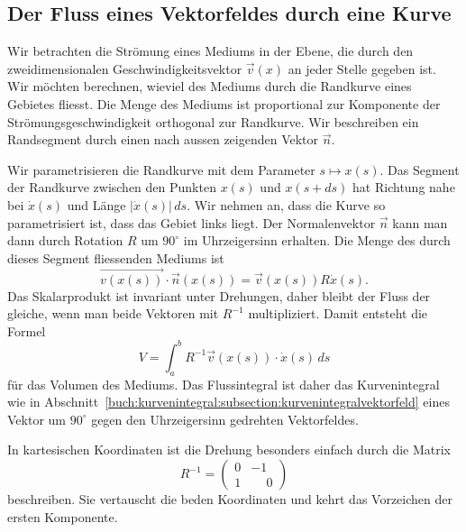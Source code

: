 %
%
\subsection{Der Fluss eines Vektorfeldes durch eine Kurve}
Wir betrachten die Strömung eines Mediums in der Ebene, die durch
den zweidimensionalen Geschwindigkeitsvektor $\vec{v}(x)$ an jeder
Stelle gegeben ist.
Wir möchten berechnen, wieviel des Mediums durch die Randkurve
eines Gebietes fliesst.
Die Menge des Mediums ist proportional zur Komponente der
Strömungsgeschwindigkeit orthogonal zur Randkurve.
%
Wir beschreiben ein Randsegment durch einen nach aussen
zeigenden Vektor $\vec{n}$.

Wir parametrisieren die Randkurve mit dem Parameter $s\mapsto x(s)$.
Das Segment der Randkurve zwischen den Punkten $x(s)$ und $x(s+ds)$
hat Richtung nahe bei $\dot{x}(s)$ und Länge $|\dot{x}(s)|\,ds$.
Wir nehmen an, dass die Kurve so parametrisiert ist, dass das Gebiet
links liegt.
Der Normalenvektor $\vec{n}$ kann man dann durch Rotation $R$ um
$90^\circ$ im Uhrzeigersinn erhalten.
Die Menge des durch dieses Segment fliessenden Mediums ist
\[
\vec{v(x(s))}\cdot \vec{n}(x(s))
=
\vec{v}(x(s)) R\dot{x}(s).
\]
Das Skalarprodukt ist invariant unter Drehungen, daher bleibt der
Fluss der gleiche, wenn man beide Vektoren mit $R^{-1}$ multipliziert.
Damit entsteht die Formel
\[
V
=
\int_a^b 
R^{-1}\vec{v}(x(s))\cdot \dot{x}(s)
\,ds
\]
für das Volumen des Mediums.
Das Flussintegral ist daher das Kurvenintegral wie in
Abschnitt~\ref{buch:kurvenintegral:subsection:kurvenintegralvektorfeld}
eines Vektor um $90^\circ$ gegen den Uhrzeigersinn gedrehten
Vektorfeldes.

In kartesischen Koordinaten ist die Drehung besonders einfach durch
die Matrix 
\[
R^{-1}
=
\begin{pmatrix}
0&-1\\
1&\phantom{-}0
\end{pmatrix}
\]
beschreiben.
Sie vertauscht die beden Koordinaten und kehrt das Vorzeichen
der ersten Komponente.

